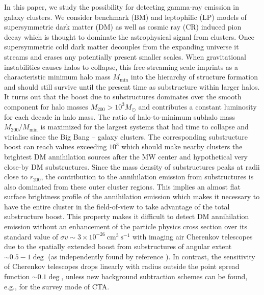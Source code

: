 \documentclass[10pt,aps,pra,reprint,amsmath,amsfonts,amssymb,showpacs,nofootinbib,floatfix]{revtex4-1}
\newcommand{\msun}{M_\odot}
\newcommand{\rvir}{r_{200}}
\newcommand{\mvir}{M_{200}}
\begin{document}
In this paper, we study the possibility for detecting gamma-ray
emission in galaxy clusters. We consider benchmark (BM) and
leptophilic (LP) models of supersymmetric dark matter (DM) as well as
cosmic ray (CR) induced pion decay which is thought to dominate the
astrophysical signal from clusters. Once supersymmetric cold dark
matter decouples from the expanding universe it streams and erases any
potentially present smaller scales. When gravitational instabilities
causes halos to collapse, this free-streaming scale imprints as a
characteristic minimum halo mass $M_\mathrm{min}$ into the hierarchy
of structure formation and should still survive until the present time
as substructure within larger halos. It turns out that the boost due
to substructures dominates over the smooth component for halo masses
$\mvir>10^3 \msun$ and contributes a constant luminosity for each
decade in halo mass. The ratio of halo-to-minimum subhalo mass
$\mvir/M_\mathrm{min}$ is maximized for the largest systems that had
time to collapse and virialise since the Big Bang -- galaxy
clusters. The corresponding substructure boost can reach values
exceeding $10^3$ which should make nearby clusters the brightest DM
annihilation sources after the MW center and hypothetical very
close-by DM substructures.  Since the mass density of substructures
peaks at radii close to $\rvir$, the contribution to the annihilation
emission from substructures is also dominated from these outer cluster
regions.  This implies an almost flat surface brightness profile of
the annihilation emission which makes it necessary to have the entire
cluster in the field-of-view to take advantage of the total
substructure boost. This property makes it difficult to detect DM
annihilation emission without an enhancement of the particle physics
cross section over its standard value of $\sigma v\sim 3\times
10^{-26} ~\mathrm{cm}^3~\mathrm{s}^{-1}$ with imaging air Cherenkov
telescopes due to the spatially extended boost from substructures of
angular extent $\sim 0.5-1\deg$ (as independently found by reference
\cite{2011arXiv1104.3530S}). In contrast, the sensitivity of Cherenkov
telescopes drops linearly with radius outside the point spread
function $\sim 0.1\deg$, unless new background subtraction schemes can
be found, e.g., for the survey mode of CTA.
\end{document}
